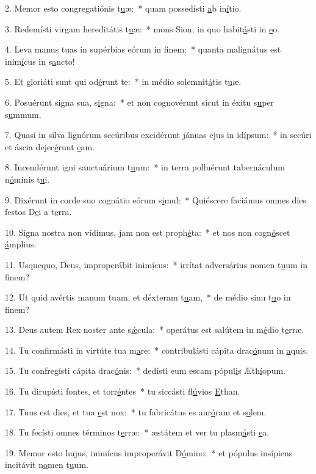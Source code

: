 2. Memor esto congregatiónis t\uline{u}æ:~* quam possedísti \uline{a}b in\uline{í}tio.\par 
3. Redemísti virgam hereditátis t\uline{u}æ:~* mons Sion, in quo habit\uline{á}sti in \uline{e}o.\par 
4. Leva manus tuas in supérbias eórum in f\uline{i}nem:~* quanta malignátus est inim\uline{í}cus in s\uline{a}ncto!\par 
5. Et gloriáti sunt qui od\uline{é}runt te:~* in médio solemnit\uline{á}tis t\uline{u}æ.\par 
6. Posuérunt signa sua, s\uline{i}gna:~* et non cognovérunt sicut in éxitu s\uline{u}per s\uline{u}mmum.\par 
7. Quasi in silva lignórum secúribus excidérunt jánuas ejus in id\uline{í}psum:~* in secúri et áscia dejec\uline{é}runt \uline{e}am.\par 
8. Incendérunt igni sanctuárium t\uline{u}um:~* in terra polluérunt tabernáculum n\uline{ó}minis t\uline{u}i.\par 
9. Dixérunt in corde suo cognátio eórum s\uline{i}mul:~* Quiéscere faciámus omnes dies festos D\uline{e}i a t\uline{e}rra.\par 
10. Signa nostra non vídimus, jam non est proph\uline{é}ta:~* et nos non cogn\uline{ó}scet \uline{á}mplius.\par 
11. Usquequo, Deus, improperábit inim\uline{í}cus:~* irrítat adversárius nomen t\uline{u}um in f\uline{i}nem?\par 
12. Ut quid avértis manum tuam, et déxteram t\uline{u}am,~* de médio sinu t\uline{u}o in f\uline{i}nem?\par 
13. Deus autem Rex noster ante s\uline{ǽ}cula:~* operátus est salútem in m\uline{é}dio t\uline{e}rræ.\par 
14. Tu confirmásti in virtúte tua m\uline{a}re:~* contribulásti cápita drac\uline{ó}num in \uline{a}quis.\par 
15. Tu confregísti cápita drac\uline{ó}nis:~* dedísti eum escam pópul\uline{i}s Æth\uline{í}opum.\par 
16. Tu dirupísti fontes, et torr\uline{é}ntes~* tu siccásti fl\uline{ú}vios \uline{E}than.\par 
17. Tuus est dies, et tua \uline{e}st nox:~* tu fabricátus es aur\uline{ó}ram et s\uline{o}lem.\par 
18. Tu fecísti omnes términos t\uline{e}rræ:~* æstátem et ver tu plasm\uline{á}sti \uline{e}a.\par 
19. Memor esto hujus, inimícus improperávit D\uline{ó}mino:~* et pópulus insípiens incitávit n\uline{o}men t\uline{u}um.\par 
